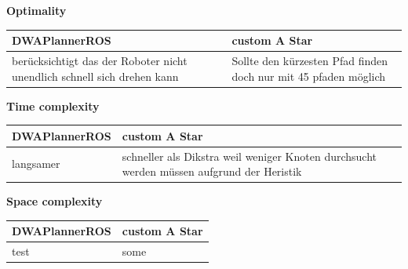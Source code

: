 \documentclass{article}
\begin{document}
\textbf{Optimality}\newline

\begin{table}[!htbp]
    \begin{tabular}{p{7cm}|p{7cm}}
        DWAPlannerROS & custom A Star \\ \bottomrule
     berücksichtigt das der Roboter nicht unendlich schnell sich drehen kann & Sollte den kürzesten Pfad finden doch nur mit 45 pfaden möglich
    \end{tabular}
\end{table}


\textbf{Time complexity}\newline

\begin{table}[!htbp]
    \begin{tabular}{p{7cm}|p{7cm}}
        DWAPlannerROS & custom A Star \\ \bottomrule
    langsamer & schneller als Dikstra weil weniger Knoten durchsucht werden müssen aufgrund der Heristik
    \end{tabular}
\end{table}

\textbf{Space complexity}\newline

\begin{table}[!htbp]
    \begin{tabular}{p{7cm}|p{7cm}}
        DWAPlannerROS & custom A Star \\ \bottomrule
        test & some
    \end{tabular}
\end{table}
\end{document}
